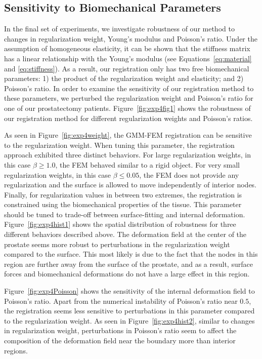 \documentclass[journal]{IEEEtran}
\begin{document}
\subsection{Sensitivity to Biomechanical Parameters}\label{sec:exp3}
In the final set of experiments, we investigate robustness of our method to changes in regularization weight, Young's modulus and Poisson's ratio. Under the assumption of homogeneous elasticity, it can be shown that the stiffness matrix has a linear relationship with the Young's modulus (see Equations~\eqref{eq:material} and \eqref{eq:stiffness}). As a result, our registration only has two free biomechanical parameters: 1) the product of the regularization weight and elasticity; and 2) Poisson's ratio. In order to examine the sensitivity of our registration method to these parameters, we perturbed the regularization weight and Poisson's ratio for one of our prostatectomy patients. Figure~\ref{fig:exp4fig1} shows the robustness of our registration method for different regularization weights and Poisson's ratios.

As seen in Figure~\ref{fig:exp4weight}, the GMM-FEM registration can be sensitive to the regularization weight. When tuning this parameter, the registration approach exhibited three distinct behaviors. For large regularization weights, in this case $\beta\geq1.0$, the FEM behaved similar to a rigid object. For very small regularization weights, in this case $\beta\leq0.05$, the FEM does not provide any regularization and the surface is allowed to move independently of interior nodes. Finally, for regularization values in between two extremes, the registration is constrained using the biomechanical properties of the tissue.  This parameter should be tuned to trade-off between surface-fitting and internal deformation. Figure~\ref{fig:exp4hist1} shows the spatial distribution of robustness for three different behaviors described above. The deformation field at the center of the prostate seems more robust to perturbations in the regularization weight compared to the surface. This most likely is due to the fact that the nodes in this region are further away from the surface of the prostate, and as a result, surface forces and biomechanical deformations do not have a large effect in this region.

Figure~\ref{fig:exp4Poisson} shows the sensitivity of the internal deformation field to Poisson's ratio. Apart from the numerical instability of Poisson's ratio near $0.5$, the registration seems less sensitive to perturbations in this parameter compared to the regularization weight. As seen in Figure~\ref{fig:exp4hist2}, similar to changes in regularization weight, perturbations in Poisson's ratio seem to affect the composition of the deformation field near the boundary more than interior regions.
\end{document}
